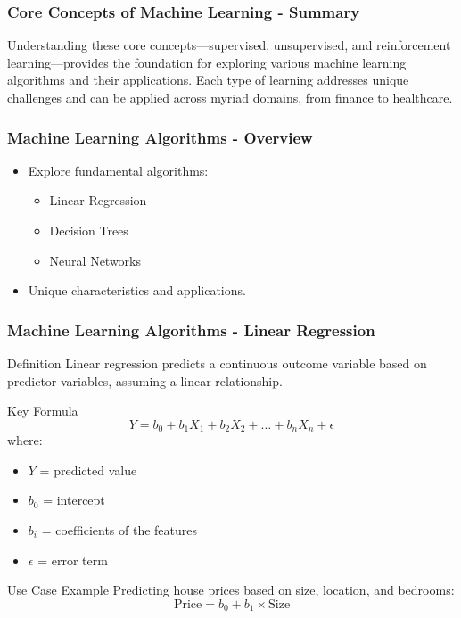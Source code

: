 \documentclass{beamer}
\begin{document}
\begin{frame}[fragile]
    \frametitle{Core Concepts of Machine Learning - Summary}
    Understanding these core concepts—supervised, unsupervised, and reinforcement learning—provides the foundation for exploring various machine learning algorithms and their applications. 
    Each type of learning addresses unique challenges and can be applied across myriad domains, from finance to healthcare.
\end{frame}

\begin{frame}[fragile]
    \frametitle{Machine Learning Algorithms - Overview}
    \begin{itemize}
        \item Explore fundamental algorithms: 
        \begin{itemize}
            \item Linear Regression
            \item Decision Trees
            \item Neural Networks
        \end{itemize}
        \item Unique characteristics and applications.
    \end{itemize}
\end{frame}

\begin{frame}[fragile]
    \frametitle{Machine Learning Algorithms - Linear Regression}
    
    \begin{block}{Definition}
        Linear regression predicts a continuous outcome variable based on predictor variables, assuming a linear relationship.
    \end{block}
    
    \begin{block}{Key Formula}
        \begin{equation}
            Y = b_0 + b_1 X_1 + b_2 X_2 + \ldots + b_n X_n + \epsilon
        \end{equation}
        where:
        \begin{itemize}
            \item $Y$ = predicted value
            \item $b_0$ = intercept
            \item $b_i$ = coefficients of the features
            \item $\epsilon$ = error term
        \end{itemize}
    \end{block}
    
    \begin{block}{Use Case Example}
        Predicting house prices based on size, location, and bedrooms:
        \begin{equation}
            \text{Price} = b_0 + b_1 \times \text{Size}
        \end{equation}
    \end{block}
\end{frame}
\end{document}
